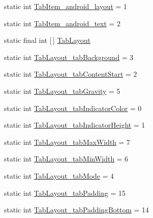 \begin{DoxyCompactItemize}
\item 
static int \hyperlink{classandroid_1_1support_1_1v7_1_1mediarouter_1_1R_1_1styleable_ab26423c3d2e3799635d79f5769bef517}{Tab\+Item\+\_\+android\+\_\+layout} = 1
\item 
static int \hyperlink{classandroid_1_1support_1_1v7_1_1mediarouter_1_1R_1_1styleable_a01c4895e66e7032ad11121089c0b602b}{Tab\+Item\+\_\+android\+\_\+text} = 2
\item 
static final int \mbox{[}$\,$\mbox{]} \hyperlink{classandroid_1_1support_1_1v7_1_1mediarouter_1_1R_1_1styleable_a94de1350e0a902b4a974d775f2f4f25e}{Tab\+Layout}
\item 
static int \hyperlink{classandroid_1_1support_1_1v7_1_1mediarouter_1_1R_1_1styleable_aacd8a2a688f5c215b79c9aec91e5e8ea}{Tab\+Layout\+\_\+tab\+Background} = 3
\item 
static int \hyperlink{classandroid_1_1support_1_1v7_1_1mediarouter_1_1R_1_1styleable_abfa3bc115c4d49ec7257d81e604f3830}{Tab\+Layout\+\_\+tab\+Content\+Start} = 2
\item 
static int \hyperlink{classandroid_1_1support_1_1v7_1_1mediarouter_1_1R_1_1styleable_a411d6e18585a008c7a903a5f997cfee4}{Tab\+Layout\+\_\+tab\+Gravity} = 5
\item 
static int \hyperlink{classandroid_1_1support_1_1v7_1_1mediarouter_1_1R_1_1styleable_afc512c65c0fbbdef2ba01c921bf019e7}{Tab\+Layout\+\_\+tab\+Indicator\+Color} = 0
\item 
static int \hyperlink{classandroid_1_1support_1_1v7_1_1mediarouter_1_1R_1_1styleable_a4886393baa84ceeef094b8f894bb3d42}{Tab\+Layout\+\_\+tab\+Indicator\+Height} = 1
\item 
static int \hyperlink{classandroid_1_1support_1_1v7_1_1mediarouter_1_1R_1_1styleable_aa303d2e4537be04bf5a1500e95eccfe5}{Tab\+Layout\+\_\+tab\+Max\+Width} = 7
\item 
static int \hyperlink{classandroid_1_1support_1_1v7_1_1mediarouter_1_1R_1_1styleable_aafab3ca12beb8f67f351f2a9588d9050}{Tab\+Layout\+\_\+tab\+Min\+Width} = 6
\item 
static int \hyperlink{classandroid_1_1support_1_1v7_1_1mediarouter_1_1R_1_1styleable_aac3d8271420cd633662292cba1169951}{Tab\+Layout\+\_\+tab\+Mode} = 4
\item 
static int \hyperlink{classandroid_1_1support_1_1v7_1_1mediarouter_1_1R_1_1styleable_a040d174a11be3d0c5f30bd26c52dca78}{Tab\+Layout\+\_\+tab\+Padding} = 15
\item 
static int \hyperlink{classandroid_1_1support_1_1v7_1_1mediarouter_1_1R_1_1styleable_a3ac9b6469877f1873d679bfb271f796b}{Tab\+Layout\+\_\+tab\+Padding\+Bottom} = 14

\end{DoxyCompactItemize}
